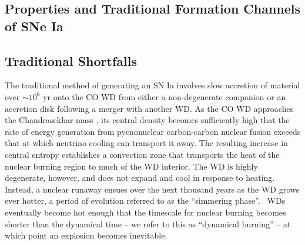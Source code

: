 \subsection{Properties and Traditional Formation Channels of SNe Ia}
\label{ssec:old_typeia}

\subsection{Traditional Shortfalls}

The traditional method of generating an SN Ia involves slow accretion of material over $\sim10^6$ yr onto the CO WD from either a non-degenerate companion or an accretion disk following a merger with another WD.  As the CO WD approaches the Chandrasekhar mass \Mch, its central density becomes sufficiently high that the rate of energy generation from pycnonuclear carbon-carbon nuclear fusion exceeds that at which neutrino cooling can transport it away.  The resulting increase in central entropy establishes a convection zone that transports the heat of the nuclear burning region to much of the WD interior.  The WD is highly degenerate, however, and does not expand and cool in response to heating.  Instead, a nuclear runaway ensues over the next thousand years as the WD grows ever hotter, a period of evolution referred to as the ``simmering phase''.  \Mch\ WDs eventually become hot enough that the timescale for nuclear burning becomes shorter than the dynamical time -- we refer to this as ``dynamical burning'' -- at which point an explosion becomes inevitable.


